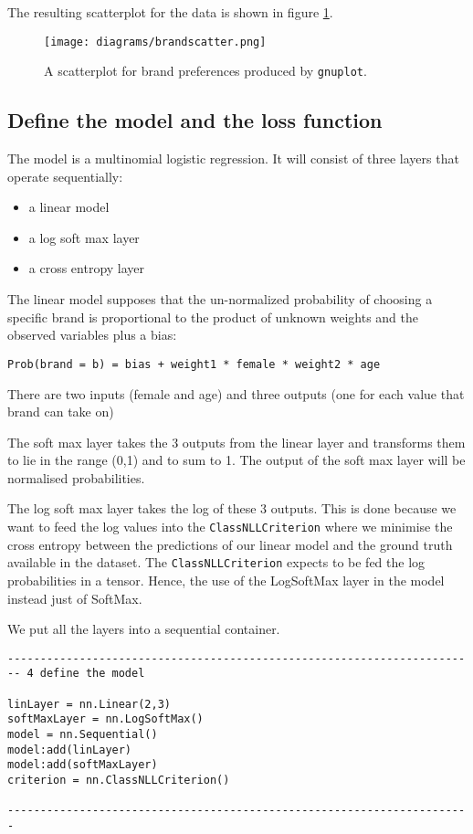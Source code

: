 The resulting scatterplot for the data is shown in figure \ref{fig:brandscatter}.

\begin{figure}[H]
\centering
\texttt{[image: diagrams/brandscatter.png]}
\caption{A scatterplot for brand preferences produced by {\tt gnuplot}.}
\label{fig:brandscatter}
\end{figure}

\subsection*{Define the model and the loss function }

The model is a multinomial logistic regression. 
It will consist of three layers that operate sequentially:

\begin{itemize}

\item[1] a linear model
\item[2] a log soft max layer
\item[3] a  cross entropy layer
\end{itemize}

The linear model supposes that the un-normalized probability of choosing
a specific brand is proportional to the product of unknown weights and 
the observed variables plus a bias:

{\tt Prob(brand = b) = bias + weight1 * female * weight2 * age }

There are two inputs (female and age) and three outputs (one for each
value that brand can take on)


The soft max layer takes the 3 outputs from the linear layer and
transforms them to lie in the range (0,1) and to sum to 1. The output
of the soft max layer will be normalised probabilities. 

The log soft max layer takes the log of these 3 outputs. This is done
because we want to feed the log values into the {\tt ClassNLLCriterion}
where  we minimise the cross entropy between
the predictions of our linear model and the ground truth available
in the dataset. The {\tt ClassNLLCriterion} expects to be fed the log probabilities in a
tensor. Hence, the use of the LogSoftMax layer in the model instead just of SoftMax.


We put all the layers into a sequential container.

\begin{verbatim}
----------------------------------------------------------------------
-- 4 define the model

linLayer = nn.Linear(2,3)
softMaxLayer = nn.LogSoftMax()  
model = nn.Sequential()
model:add(linLayer)
model:add(softMaxLayer)
criterion = nn.ClassNLLCriterion()

-----------------------------------------------------------------------

\end{verbatim}

